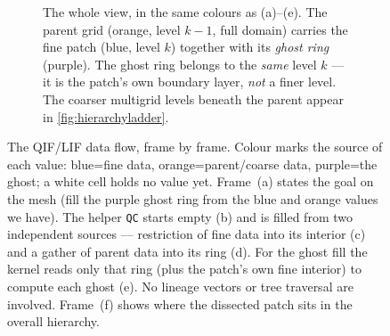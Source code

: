\documentclass[11pt,oneside,openany]{book}
\newcommand{\code}[1]{\textnormal{\texttt{#1}}}
\begin{document}
\begin{figure}[p]
\smallskip
\begin{subfigure}{\textwidth}\centering
{}
\caption{The whole view, in the same colours as (a)--(e). The parent grid (orange, level $k{-}1$, full domain) carries the fine patch (blue, level $k$) together with its \emph{ghost ring} (purple). The ghost ring belongs to the \emph{same} level $k$ --- it is the patch's own boundary layer, \emph{not} a finer level. The coarser multigrid levels beneath the parent appear in \cref{fig:hierarchyladder}.}
\end{subfigure}
\caption{The QIF/LIF data flow, frame by frame. Colour marks the source of each value: \textcolor{cbBlue}{blue}=fine data, \textcolor{cbOrange}{orange}=parent/coarse data, \textcolor{cbPurple}{purple}=the ghost; a white cell holds no value yet. Frame~(a) states the goal on the mesh (fill the purple ghost ring from the blue and orange values we have). The helper \code{QC} starts empty (b) and is filled from two independent sources --- restriction of fine data into its interior (c) and a gather of parent data into its ring (d). For the ghost fill the kernel reads only that ring (plus the patch's own fine interior) to compute each ghost (e). No lineage vectors or tree traversal are involved. Frame~(f) shows where the dissected patch sits in the overall hierarchy.}
\label{fig:qcpipeline}
\end{figure}
\end{document}
